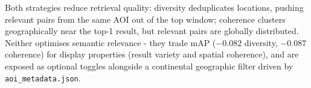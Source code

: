 \documentclass{article}
\begin{document}
\begin{appendices}
Both strategies reduce retrieval quality: diversity deduplicates locations,
pushing relevant pairs from the same AOI out of the top window; coherence clusters
geographically near the top-1 result, but relevant pairs are globally distributed.
Neither optimises semantic relevance - they trade mAP ($-0.082$ diversity,
$-0.087$ coherence) for display properties (result variety and spatial coherence),
and are exposed as optional toggles alongside a continental geographic filter
driven by \texttt{aoi\_metadata.json}.

\end{appendices}
\end{document}

